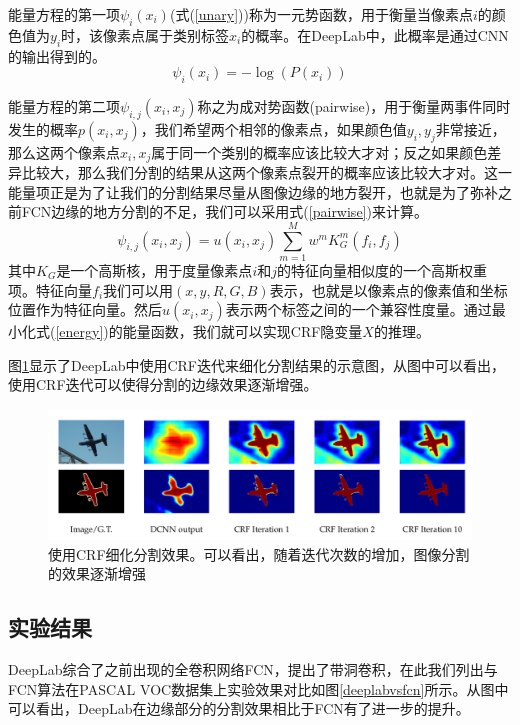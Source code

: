 \documentclass[cn]{elegantbook}
\begin{document}
能量方程的第一项$\psi_i(x_i)$(式(\ref{unary}))称为一元势函数，用于衡量当像素点$i$的颜色值为$y_i$时，该像素点属于类别标签$x_i$的概率。在DeepLab中，此概率是通过CNN的输出得到的。
\begin{equation}
\label{unary}
\psi_i(x_i)=-\log(P(x_i))
\end{equation}

能量方程的第二项$\psi_{i,j}(x_i,x_j)$称之为成对势函数(pairwise)，用于衡量两事件同时发生的概率$p(x_i,x_j)$，我们希望两个相邻的像素点，如果颜色值$y_i,y_j$非常接近，那么这两个像素点$x_i,x_j$属于同一个类别的概率应该比较大才对；反之如果颜色差异比较大，那么我们分割的结果从这两个像素点裂开的概率应该比较大才对。这一能量项正是为了让我们的分割结果尽量从图像边缘的地方裂开，也就是为了弥补之前FCN边缘的地方分割的不足，我们可以采用式(\ref{pairwise})来计算。
\begin{equation}
\label{pairwise}
\psi_{i,j}(x_i,x_j)=u(x_i,x_j)\sum_{m=1}^{M}w^mK_G^m(f_i,f_j)
\end{equation}
其中$K_G$是一个高斯核，用于度量像素点$i$和$j$的特征向量相似度的一个高斯权重项。特征向量$f_i$我们可以用$(x,y,R,G,B)$表示，也就是以像素点的像素值和坐标位置作为特征向量。然后$u(x_i,x_j)$表示两个标签之间的一个兼容性度量。通过最小化式(\ref{energy})的能量函数，我们就可以实现CRF隐变量$X$的推理。

图\ref{crf1}显示了DeepLab中使用CRF迭代来细化分割结果的示意图，从图中可以看出，使用CRF迭代可以使得分割的边缘效果逐渐增强。
\begin{figure}[!h]
	\centering
	\includegraphics[width=\textwidth]{images/crf}
	\caption{\label{crf1}使用CRF细化分割效果。可以看出，随着迭代次数的增加，图像分割的效果逐渐增强}
\end{figure}

\subsection{实验结果}
DeepLab综合了之前出现的全卷积网络FCN，提出了带洞卷积，在此我们列出与FCN算法在PASCAL VOC数据集上实验效果对比如图\ref{deeplabvsfcn}所示。从图中可以看出，DeepLab在边缘部分的分割效果相比于FCN有了进一步的提升。
\end{document}
